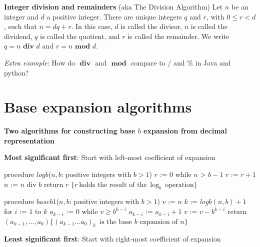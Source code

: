 \documentclass[12pt, oneside]{article}
\begin{document}
{\bf Integer division and remainders} (aka The Division Algorithm) Let $n$ be an integer 
and $d$ a positive integer. There are unique integers $q$ and $r$, with $0 \leq r < d$, such that 
$n = dq + r$. In this case, $d$ is called the divisor, $n$ is called the dividend, 
$q$ is called the quotient, 
and $r$ is called the remainder. We write $q=n \textbf{ div } d$ and $r=n \textbf{ mod } d$.

\textit{Extra example}: How do $\textbf{ div }$ and $\textbf{ mod }$ compare to $/$ and $\%$ in Java and python?

\vfill
 \vfill
\section*{Base expansion algorithms}


{\bf Two algorithms for constructing base $b$ expansion from decimal representation}

{\bf Most significant first}: Start with left-most coefficient of expansion
\begin{multicols}{2}
\begin{algorithm}[caption={Calculating integer part of $\log_b$}]
procedure $\textit{logb}$($n, b$: positive integers with $b > 1$)
$r$ := $0$
while $n$ > $b-1$
  $r$ := $r + 1$
  $n$ := $n$ div $b$
return $r$ $\{ r~\textrm{holds the result of the}~\log_b~\textrm{operation}\}$
\end{algorithm}
\columnbreak
\begin{algorithm}[caption={Calculating base $b$ expansion, from left}]
procedure $\textit{baseb1}$($n, b$: positive integers with $b > 1$)
$v$ := $n$
$k$ := $logb(n,b) + 1$
for $i$ := $1$ to $k$
  $a_{k-i}$ := $0$
  while $v \geq b^{k-i}$
    $a_{k-i}$ := $a_{k-i} + 1$
    $v$ := $v -  b^{k-i}$
return $(a_{k-1}, \ldots, a_0) \{(a_{k-1} \ldots a_0)_b~\textrm{ is the base } b \textrm{ expansion of } n \}$
\end{algorithm}
\end{multicols}

\vfill
\vfill

{\bf Least significant first}: Start with right-most coefficient of expansion
\end{document}

